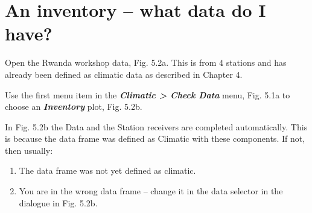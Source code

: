 \documentclass[
  letterpaper,
  DIV=11,
  numbers=noendperiod]{scrreprt}
\begin{document}
\section{An inventory -- what data do I
have?}\label{an-inventory-what-data-do-i-have}

Open the Rwanda workshop data, Fig. 5.2a. This is from 4 stations and
has already been defined as climatic data as described in Chapter 4.

Use the first menu item in the \textbf{\emph{Climatic \textgreater{}
Check Data}} menu, Fig. 5.1a to choose an \textbf{\emph{Inventory}}
plot, Fig. 5.2b.

In Fig. 5.2b the Data and the Station receivers are completed
automatically. This is because the data frame was defined as Climatic
with these components. If not, then usually:

\begin{enumerate}
\def\labelenumi{\alph{enumi}.}
\item
  The data frame was not yet defined as climatic.
\item
  You are in the wrong data frame -- change it in the data selector in
  the dialogue in Fig. 5.2b.
\end{enumerate}
\end{document}

